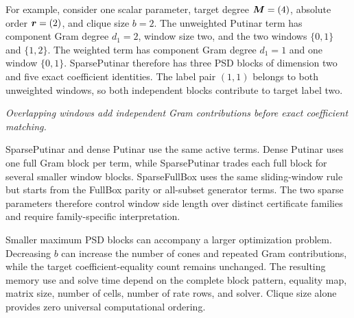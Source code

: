 For example, consider one scalar parameter, target degree $\boldsymbol{M}=(4)$, absolute order $\boldsymbol{r}=(2)$, and clique size $b=2$. The unweighted Putinar term has component Gram degree $d_1=2$, window size two, and the two windows $\{0,1\}$ and $\{1,2\}$. The weighted term has component Gram degree $d_1=1$ and one window $\{0,1\}$. SparsePutinar therefore has three PSD blocks of dimension two and five exact coefficient identities. The label pair $(1,1)$ belongs to both unweighted windows, so both independent blocks contribute to target label two.

\begin{center}

\textit{Overlapping windows add independent Gram contributions before exact coefficient matching.}
\end{center}

SparsePutinar and dense Putinar use the same active terms. Dense Putinar uses one full Gram block per term, while SparsePutinar trades each full block for several smaller window blocks. SparseFullBox uses the same sliding-window rule but starts from the FullBox parity or all-subset generator terms. The two sparse parameters therefore control window side length over distinct certificate families and require family-specific interpretation.

Smaller maximum PSD blocks can accompany a larger optimization problem. Decreasing $b$ can increase the number of cones and repeated Gram contributions, while the target coefficient-equality count remains unchanged. The resulting memory use and solve time depend on the complete block pattern, equality map, matrix size, number of cells, number of rate rows, and solver. Clique size alone provides zero universal computational ordering.

